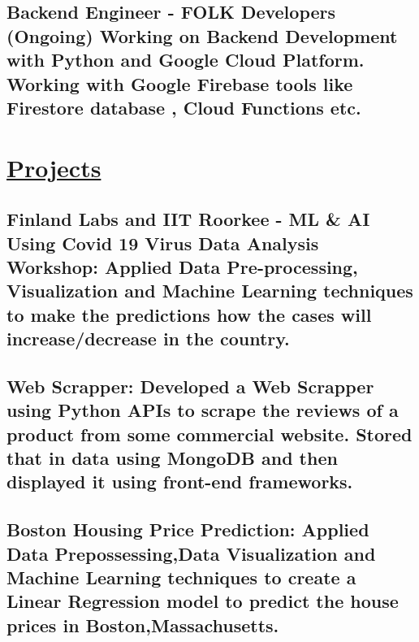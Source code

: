 \documentclass{article}
\begin{document}
    \subsection{\textbf{Backend Engineer}
    \textmd{- FOLK Developers (Ongoing)}\newline 
    \textmd{Working on Backend Development with Python and Google Cloud Platform. Working with Google Firebase tools like Firestore database , Cloud Functions etc. } }
    
\section{\underline{Projects}}

    \subsection{\textbf{Finland Labs and IIT Roorkee - ML \& AI Using Covid 19 Virus Data Analysis Workshop:}
    \textmd{Applied Data Pre-processing, Visualization and Machine Learning techniques to make the predictions how the cases will increase/decrease in the country. } }

    \subsection{\textbf{Web Scrapper:}
    \textmd{Developed a Web Scrapper using Python APIs to scrape the reviews of a product from some commercial website.
    Stored that in data using MongoDB and then displayed it using front-end frameworks.}}

    \subsection{\textbf{Boston Housing Price Prediction:}
    \textmd{Applied Data Prepossessing,Data Visualization and Machine Learning techniques to create a 
    Linear Regression model to predict the house prices in Boston,Massachusetts. } }

\end{document}

